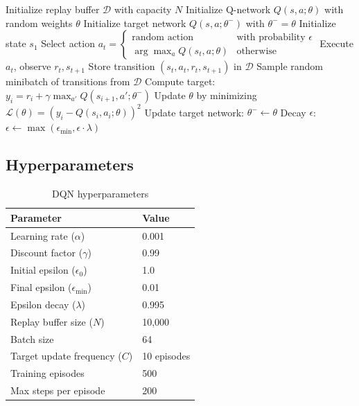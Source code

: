 \documentclass[12pt,a4paper]{article}
\begin{document}
\begin{algorithm}[H]
\caption{Deep Q-Network with Experience Replay and Target Network}
\begin{algorithmic}[1]
\STATE Initialize replay buffer $\mathcal{D}$ with capacity $N$
\STATE Initialize Q-network $Q(s,a;\theta)$ with random weights $\theta$
\STATE Initialize target network $Q(s,a;\theta^-)$ with $\theta^- = \theta$
    \STATE Initialize state $s_1$
        \STATE Select action $a_t = \begin{cases}
            \text{random action} & \text{with probability } \epsilon \\
            \arg\max_a Q(s_t, a; \theta) & \text{otherwise}
        \end{cases}$
        \STATE Execute $a_t$, observe $r_t, s_{t+1}$
        \STATE Store transition $(s_t, a_t, r_t, s_{t+1})$ in $\mathcal{D}$
        \STATE Sample random minibatch of transitions from $\mathcal{D}$
        \STATE Compute target: $y_i = r_i + \gamma \max_{a'} Q(s_{i+1}, a'; \theta^-)$
        \STATE Update $\theta$ by minimizing $\mathcal{L}(\theta) = (y_i - Q(s_i, a_i; \theta))^2$
            \STATE Update target network: $\theta^- \leftarrow \theta$
        \ENDIF
    \ENDFOR
    \STATE Decay $\epsilon$: $\epsilon \leftarrow \max(\epsilon_{\min}, \epsilon \cdot \lambda)$
\ENDFOR
\end{algorithmic}
\end{algorithm}

\subsection{Hyperparameters}

\begin{table}[H]
\centering
\begin{tabular}{ll}
\toprule
\textbf{Parameter} & \textbf{Value} \\
\midrule
Learning rate ($\alpha$) & 0.001 \\
Discount factor ($\gamma$) & 0.99 \\
Initial epsilon ($\epsilon_0$) & 1.0 \\
Final epsilon ($\epsilon_{\min}$) & 0.01 \\
Epsilon decay ($\lambda$) & 0.995 \\
Replay buffer size ($N$) & 10,000 \\
Batch size & 64 \\
Target update frequency ($C$) & 10 episodes \\
Training episodes & 500 \\
Max steps per episode & 200 \\
\bottomrule
\end{tabular}
\caption{DQN hyperparameters}
\end{table}
\end{document}

